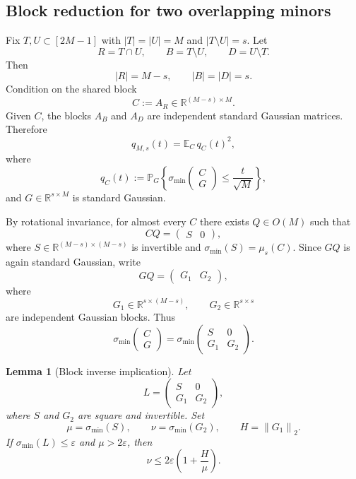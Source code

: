 \documentclass[11pt]{article}
\newtheorem{lemma}{Lemma}
\newcommand{\R}{\mathbb R}
\newcommand{\Pbb}{\mathbb P}
\newcommand{\Ebb}{\mathbb E}
\newcommand{\1}{\mathbf 1}
\newcommand{\norm}[1]{\left\lVert #1\right\rVert}
\newcommand{\smin}{\sigma_{\min}}
\newcommand{\eps}{\varepsilon}
\begin{document}
\subsection{Block reduction for two overlapping minors}

Fix \(T,U\subset[2M-1]\) with \(|T|=|U|=M\) and
\(|T\setminus U|=s\).  Let
\[
        R=T\cap U,
        \qquad
        B=T\setminus U,
        \qquad
        D=U\setminus T.
\]
Then
\[
        |R|=M-s,
        \qquad
        |B|=|D|=s.
\]
Condition on the shared block
\[
        C:=A_R\in\R^{(M-s)\times M}.
\]
Given \(C\), the blocks \(A_B\) and \(A_D\) are independent standard Gaussian matrices.
Therefore
\begin{equation}
        q_{M,s}(t)
        =
        \Ebb_C\,q_C(t)^2,
        \label{eq:qCsquare}
\end{equation}
where
\[
        q_C(t)
        :=
        \Pbb_G\left\{
        \smin\begin{pmatrix}C\\G\end{pmatrix}
        \le
        \frac{t}{\sqrt M}
        \right\},
\]
and \(G\in\R^{s\times M}\) is standard Gaussian.

By rotational invariance, for almost every \(C\) there exists \(Q\in O(M)\) such that
\[
        CQ=\begin{pmatrix}S&0\end{pmatrix},
\]
where \(S\in\R^{(M-s)\times(M-s)}\) is invertible and
\(\smin(S)=\mu_s(C)\).  Since \(GQ\) is again standard Gaussian, write
\[
        GQ=\begin{pmatrix}G_1&G_2\end{pmatrix},
\]
where
\[
        G_1\in\R^{s\times(M-s)},
        \qquad
        G_2\in\R^{s\times s}
\]
are independent Gaussian blocks.  Thus
\[
        \smin\begin{pmatrix}C\\G\end{pmatrix}
        =
        \smin
        \begin{pmatrix}
        S&0\\G_1&G_2
        \end{pmatrix}.
\]

\begin{lemma}[Block inverse implication]
Let
\[
        L=
        \begin{pmatrix}
        S&0\\G_1&G_2
        \end{pmatrix},
\]
where \(S\) and \(G_2\) are square and invertible.  Set
\[
        \mu=\smin(S),
        \qquad
        \nu=\smin(G_2),
        \qquad
        H=\norm{G_1}_2.
\]
If \(\smin(L)\le\eps\) and \(\mu>2\eps\), then
\begin{equation}
        \nu
        \le
        2\eps\left(1+\frac{H}{\mu}\right).
        \label{eq:block-implication}
\end{equation}
\end{lemma}
\end{document}
